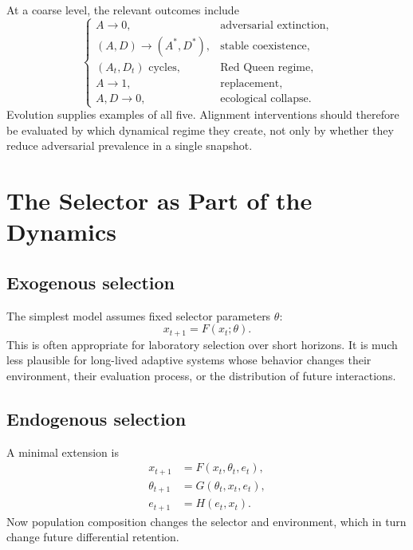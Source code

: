 \documentclass[11pt]{article}
\begin{document}
At a coarse level, the relevant outcomes include
\begin{equation}
\begin{cases}
A\rightarrow 0, & \text{adversarial extinction},\\
(A,D)\rightarrow(A^*,D^*), & \text{stable coexistence},\\
(A_t,D_t)\text{ cycles}, & \text{Red Queen regime},\\
A\rightarrow 1, & \text{replacement},\\
A,D\rightarrow 0, & \text{ecological collapse}.
\end{cases}
\end{equation}
Evolution supplies examples of all five. Alignment interventions should therefore be evaluated by which dynamical regime they create, not only by whether they reduce adversarial prevalence in a single snapshot.

\section{The Selector as Part of the Dynamics}

\subsection{Exogenous selection}

The simplest model assumes fixed selector parameters $\theta$:
\begin{equation}
    x_{t+1}=F(x_t;\theta).
    \label{eq:exogenous}
\end{equation}
This is often appropriate for laboratory selection over short horizons. It is much less plausible for long-lived adaptive systems whose behavior changes their environment, their evaluation process, or the distribution of future interactions.

\subsection{Endogenous selection}

A minimal extension is
\begin{align}
    x_{t+1} &= F(x_t,\theta_t,e_t),\\
    \theta_{t+1} &= G(\theta_t,x_t,e_t),\\
    e_{t+1} &= H(e_t,x_t).
    \label{eq:endogenous-system}
\end{align}
Now population composition changes the selector and environment, which in turn change future differential retention.
\end{document}
